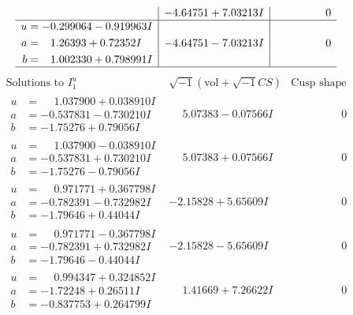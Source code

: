 \documentclass[1p]{elsarticle_modified}
\theoremstyle{definition}
\newcommand{\I}{\sqrt{-1}}
\begin{document}
$$\begin{array}{c|c|c}
 & -4.64751 + 7.03213 I & \phantom{-0.000000 } 0 \\ \hline\begin{aligned}
u &= -0.299064 - 0.919963 I \\
a &= \phantom{-}1.26393 + 0.72352 I \\
b &= \phantom{-}1.002330 + 0.798991 I\end{aligned}
 & -4.64751 - 7.03213 I & \phantom{-0.000000 } 0\\
 \hline 
 \end{array}$$\newpage$$\begin{array}{c|c|c}  
\text{Solutions to }I^u_{1}& \I (\text{vol} + \sqrt{-1}CS) & \text{Cusp shape}\\
 \hline 
\begin{aligned}
u &= \phantom{-}1.037900 + 0.038910 I \\
a &= -0.537831 - 0.730210 I \\
b &= -1.75276 + 0.79056 I\end{aligned}
 & \phantom{-}5.07383 - 0.07566 I & \phantom{-0.000000 } 0 \\ \hline\begin{aligned}
u &= \phantom{-}1.037900 - 0.038910 I \\
a &= -0.537831 + 0.730210 I \\
b &= -1.75276 - 0.79056 I\end{aligned}
 & \phantom{-}5.07383 + 0.07566 I & \phantom{-0.000000 } 0 \\ \hline\begin{aligned}
u &= \phantom{-}0.971771 + 0.367798 I \\
a &= -0.782391 - 0.732982 I \\
b &= -1.79646 + 0.44044 I\end{aligned}
 & -2.15828 + 5.65609 I & \phantom{-0.000000 } 0 \\ \hline\begin{aligned}
u &= \phantom{-}0.971771 - 0.367798 I \\
a &= -0.782391 + 0.732982 I \\
b &= -1.79646 - 0.44044 I\end{aligned}
 & -2.15828 - 5.65609 I & \phantom{-0.000000 } 0 \\ \hline\begin{aligned}
u &= \phantom{-}0.994347 + 0.324852 I \\
a &= -1.72248 + 0.26511 I \\
b &= -0.837753 + 0.264799 I\end{aligned}
 & \phantom{-}1.41669 + 7.26622 I & \phantom{-0.000000 } 0 \\ \hline\begin{aligned}

\end{aligned}
\end{array}$$
\end{document}
